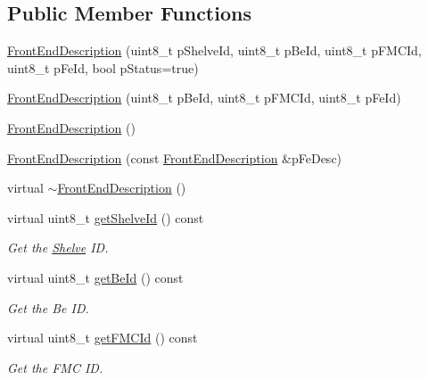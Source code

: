 \subsection*{Public Member Functions}
\begin{CompactItemize}
\item 
\hyperlink{class_ph2___hw_description_1_1_front_end_description_9605f28b75ce29cba767fe6efb9d9d19}{Front\-End\-Description} (uint8\_\-t p\-Shelve\-Id, uint8\_\-t p\-Be\-Id, uint8\_\-t p\-FMCId, uint8\_\-t p\-Fe\-Id, bool p\-Status=true)
\item 
\hyperlink{class_ph2___hw_description_1_1_front_end_description_38c5f465c7227c8cf3f897ab88f9598c}{Front\-End\-Description} (uint8\_\-t p\-Be\-Id, uint8\_\-t p\-FMCId, uint8\_\-t p\-Fe\-Id)
\item 
\hyperlink{class_ph2___hw_description_1_1_front_end_description_3fc1d338b2fb7eca2c8b0038ed235daf}{Front\-End\-Description} ()
\item 
\hyperlink{class_ph2___hw_description_1_1_front_end_description_da01bf978797bf26295f1947b6896efa}{Front\-End\-Description} (const \hyperlink{class_ph2___hw_description_1_1_front_end_description}{Front\-End\-Description} \&p\-Fe\-Desc)
\item 
virtual \hyperlink{class_ph2___hw_description_1_1_front_end_description_8ff5e1dc9dc09e6db9c105a362000e89}{$\sim$Front\-End\-Description} ()
\item 
virtual uint8\_\-t \hyperlink{class_ph2___hw_description_1_1_front_end_description_d38bbaceaee52efe13614561059a0930}{get\-Shelve\-Id} () const 
\begin{CompactList}\small\item\em Get the \hyperlink{class_ph2___hw_description_1_1_shelve}{Shelve} ID. \item\end{CompactList}\item 
virtual uint8\_\-t \hyperlink{class_ph2___hw_description_1_1_front_end_description_093089d617b1a7d4f0b3bf8a83d2eddf}{get\-Be\-Id} () const 
\begin{CompactList}\small\item\em Get the Be ID. \item\end{CompactList}\item 
virtual uint8\_\-t \hyperlink{class_ph2___hw_description_1_1_front_end_description_d5af03f0adc80ee53511ea7e1dfeeea0}{get\-FMCId} () const 
\begin{CompactList}\small\item\em Get the FMC ID. \item\end{CompactList}\item 

\end{CompactItemize}
